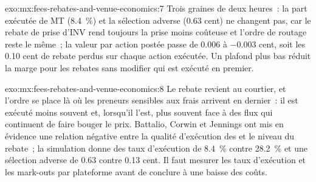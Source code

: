 \begin{solution}{exo:mx:fees-rebates-and-venue-economics:7}
Trois graines de deux heures~: la part exécutée de MT (8.4~\%) et la sélection adverse (0.63 cent) ne changent pas, car le rebate de prise d'INV rend toujours la prise
moins coûteuse et l'ordre de routage reste le même~; la valeur par action postée passe de 0.006 à $-0.003$ cent, soit les 0.10 cent de rebate perdus sur chaque action exécutée.
Un plafond plus bas réduit la marge pour les rebates sans modifier qui est exécuté en premier.
\end{solution}

\begin{solution}{exo:mx:fees-rebates-and-venue-economics:8}
Le rebate revient au courtier, et l'ordre se place là où les preneurs sensibles aux frais arrivent en dernier~: il est exécuté moins souvent et, lorsqu'il l'est, plus souvent face à des flux
qui continuent de faire bouger le prix. Battalio, Corwin et Jennings ont mis en évidence une relation négative entre la qualité d'exécution des  et le niveau du rebate~; la
simulation donne des taux d'exécution de 8.4~\% contre 28.2~\% et une sélection adverse de 0.63 contre 0.13 cent. Il faut mesurer les taux d'exécution et les mark-outs par plateforme avant de conclure
à une baisse des coûts.
\end{solution}

